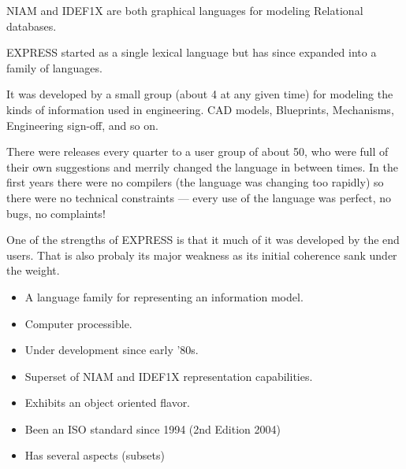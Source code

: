 \begin{remarks}
\remintro


    NIAM and IDEF1X are both graphical languages for modeling Relational 
databases.

    EXPRESS started as a single lexical language but has since expanded
into a family of languages.

    It was developed by a small group (about 4 at any given time) for
modeling the kinds of information used in engineering. CAD models, Blueprints,
Mechanisms, Engineering sign-off, and so on.

    There were releases every quarter to a user group of about 50, who were full
of their own suggestions and merrily changed the language in between times.
In the first years there were no compilers (the language was changing too 
rapidly) so there were no technical constraints --- every use of the language
was perfect, no bugs, no complaints!

    One of the strengths of EXPRESS is that it much of it was developed by the 
end users. That is also probaly its major weakness as its initial coherence
sank under the weight.

\remend
\end{remarks}


\begin{itemize}
\item A language family for representing an information model.
\item Computer processible.
\item Under development since early '80s.
\item Superset of NIAM and IDEF1X representation capabilities.
\item Exhibits an object oriented flavor.
\item Been an ISO standard since 1994 (2nd Edition 2004)
\item Has several aspects (subsets)
\end{itemize}


